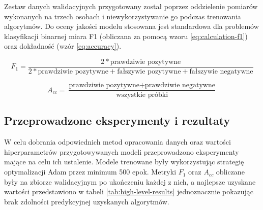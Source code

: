 \documentclass{./assets/wfis}
\begin{document}
Zestaw danych walidacyjnych przygotowany został poprzez oddzielenie pomiarów wykonanych na trzech osobach i niewykorzystywanie go podczas trenowania algorytmów. Do oceny jakości modelu stosowana jest standardowa dla problemów klasyfikacji binarnej miara F1 (obliczana za pomocą wzoru \ref{eq:calculation-f1}) oraz dokładność (wzór \ref{eq:accuracy}).

\begin{equation}\label{eq:calculation-f1}
    F_1 = \frac{2*\text{prawdziwie pozytywne}}{2*\text{prawdziwie pozytywne}+\text{fałszywie pozytywne}+\text{fałszywie negatywne}}
\end{equation}

\begin{equation}\label{eq:accuracy}
    A_{cc} = \frac{\text{prawdziwie pozytywne} + \text{prawdziwie negatywne}}{\text{wszystkie próbki}}
\end{equation}

\subsection{Przeprowadzone eksperymenty i rezultaty}
W celu dobrania odpowiednich metod opracowania danych oraz wartości hiperparametrów przygotowywanych modeli przeprowadzono eksperymenty mające na celu ich ustalenie. Modele trenowane były wykorzystując strategię optymalizacji Adam \cite{kingma_adam_2017} przez minimum 500 epok. Metryki $F_1$ oraz $A_{cc}$ obliczane były na zbiorze walidacyjnym po ukończeniu każdej z nich, a najlepsze uzyskane wartości przedstawiono w tabeli \ref{tab:high-level-results} jednoznacznie pokazując brak zdolności predykcyjnej uzyskanych algorytmów.




\end{document}
